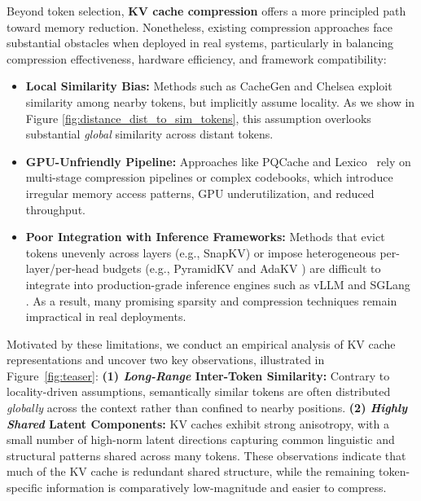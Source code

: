 Beyond token selection, \textbf{KV cache compression} offers a more principled path toward memory reduction. 
Nonetheless, existing compression approaches face substantial obstacles when deployed in real systems, particularly in balancing compression effectiveness, hardware efficiency, and framework compatibility:
\begin{itemize}[nolistsep, left=0pt]
  \item \textbf{Local Similarity Bias:}
  Methods such as CacheGen \cite{liu2024cachegen} and Chelsea \cite{hu2025efficient_chelsea} exploit similarity among nearby tokens, but implicitly assume locality. 
  As we show in Figure \ref{fig:distance_dist_to_sim_tokens}, this assumption overlooks substantial \emph{global} similarity across distant tokens.
  
  \item \textbf{GPU-Unfriendly Pipeline:}
  Approaches like PQCache \cite{zhang2025pqcache} and Lexico~\cite{kim2024lexico} rely on multi-stage compression pipelines or complex codebooks, which introduce irregular memory access patterns, GPU underutilization, and reduced throughput.

  \item \textbf{Poor Integration with Inference Frameworks:} 
  Methods that evict tokens unevenly across layers (e.g., SnapKV) or impose heterogeneous per-layer/per-head budgets (e.g., PyramidKV \cite{cai2024pyramidkv} and AdaKV \cite{feng2025adakv}) are difficult to integrate into production-grade inference engines such as vLLM \cite{kwon2023efficient_vllm} and SGLang \cite{zheng2024sglang}. 
  As a result, many promising sparsity and compression techniques remain impractical in real deployments.
\end{itemize}

Motivated by these limitations, we conduct an empirical analysis of KV cache representations and uncover two key observations, illustrated in Figure~\ref{fig:teaser}:
\textbf{(1) \emph{Long-Range} Inter-Token Similarity:} Contrary to locality-driven assumptions, semantically similar tokens are often distributed \emph{globally} across the context rather than confined to nearby positions.
\textbf{(2) \emph{Highly Shared} Latent Components:} KV caches exhibit strong anisotropy, with a small number of high-norm latent directions capturing common linguistic and structural patterns shared across many tokens.
These observations indicate that much of the KV cache is redundant shared structure, while the remaining token-specific information is comparatively low-magnitude and easier to compress.

